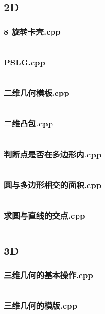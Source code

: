 \documentclass[a4paper,11pt]{article}
\begin{document}
\subsection{2D}
\subsubsection{8 旋转卡壳.cpp}
\inputminted[breaklines]{c++}{"D:/tmplz/templates/几何/2D/8 旋转卡壳.cpp"}
\subsubsection{PSLG.cpp}
\inputminted[breaklines]{c++}{"D:/tmplz/templates/几何/2D/PSLG.cpp"}
\subsubsection{二维几何模板.cpp}
\inputminted[breaklines]{c++}{"D:/tmplz/templates/几何/2D/二维几何模板.cpp"}
\subsubsection{二维凸包.cpp}
\inputminted[breaklines]{c++}{"D:/tmplz/templates/几何/2D/二维凸包.cpp"}
\subsubsection{判断点是否在多边形内.cpp}
\inputminted[breaklines]{c++}{"D:/tmplz/templates/几何/2D/判断点是否在多边形内.cpp"}
\subsubsection{圆与多边形相交的面积.cpp}
\inputminted[breaklines]{c++}{"D:/tmplz/templates/几何/2D/圆与多边形相交的面积.cpp"}
\subsubsection{求圆与直线的交点.cpp}
\inputminted[breaklines]{c++}{"D:/tmplz/templates/几何/2D/求圆与直线的交点.cpp"}
\subsection{3D}
\subsubsection{三维几何的基本操作.cpp}
\inputminted[breaklines]{c++}{"D:/tmplz/templates/几何/3D/三维几何的基本操作.cpp"}
\subsubsection{三维几何的模版.cpp}
\inputminted[breaklines]{c++}{"D:/tmplz/templates/几何/3D/三维几何的模版.cpp"}
\end{document}

